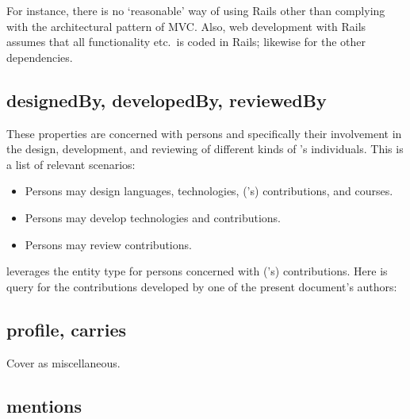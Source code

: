 

\noindent
For instance, there is no `reasonable' way of using Rails other than
complying with the architectural pattern of MVC. Also, web development
with Rails assumes that all functionality etc.\ is coded in Rails;
likewise for the other dependencies.


\subsection{designedBy, developedBy, reviewedBy}

These properties are concerned with persons and specifically
their involvement in the design, development, and reviewing of
different kinds of \solasote{}'s individuals. This is a list of
relevant scenarios:
%
\begin{itemize}
\item Persons may design languages, technologies, (\ooo{}'s) contributions, and
  courses.
\item Persons may develop technologies and contributions.
\item Persons may review contributions.
\end{itemize}
%
\solasote{} leverages the entity type  for
persons concerned with (\ooo{}'s) contributions. Here is query for the
contributions developed by one of the present document's authors:




\subsection{profile, carries}

Cover as miscellaneous.


\subsection{mentions}


